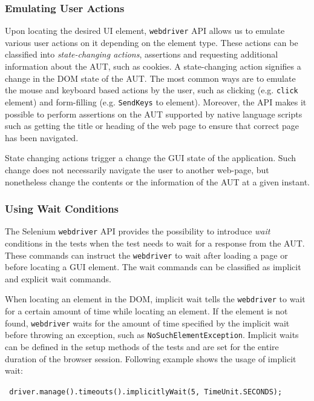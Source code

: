 \subsubsection{Emulating User Actions}
\label{sssec:emulatingActions}
Upon locating the desired UI element, \texttt{webdriver} API allows us to emulate various user actions on it depending on the element type. These actions can be classified into \textit{state-changing actions}, assertions and requesting additional information about the AUT, such as cookies. A state-changing action signifies a change in the DOM state of the AUT. The most common ways are to emulate the mouse and keyboard based actions by the user, such as clicking (e.g. \texttt{click} element) and form-filling (e.g. \texttt{SendKeys} to element). Moreover, the API makes it possible to perform assertions on the AUT supported by native language scripts such as getting the title or heading of the web page to ensure that correct page has been navigated. 

State changing actions trigger a change the GUI state of the application. Such change does not necessarily navigate the user to another web-page, but nonetheless change the contents or the information of the AUT at a given instant.

\subsubsection{Using Wait Conditions}
\label{sssec:seleniumwaits}
The Selenium \texttt{webdriver} API provides the possibility to introduce \textit{wait} conditions in the tests when the test needs to wait for a response from the AUT. These commands can instruct the \texttt{webdriver} to wait after loading a page or before locating a GUI element. The wait commands can be classified as implicit and explicit wait commands. 

When locating an element in the DOM, implicit wait tells the \texttt{webdriver} to wait for a certain amount of time while locating an element. If the element is not found, \texttt{webdriver} waits for the amount of time specified by the implicit wait before throwing an exception, such as \texttt{NoSuchElementException}. Implicit waits can be defined in the setup methods of the tests and are set for the entire duration of the browser session. Following example shows the usage of implicit wait:
\begin{footnotesize}
\texttt{ driver.manage().timeouts().implicitlyWait(5, TimeUnit.SECONDS); 
}
\end{footnotesize}

